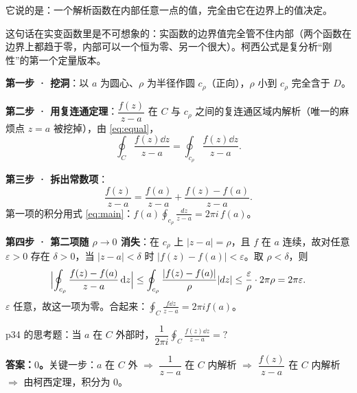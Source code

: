 \documentclass[11pt]{ctexart}
\let\origsubhdr\subhdr
\renewcommand{\subhdr}[1]{\par\needspace{4\baselineskip}\origsubhdr{#1}}
\begin{document}
它说的是：一个解析函数在内部任意一点的值，完全由它在边界上的值决定。


这句话在实变函数里是不可想象的：实函数的边界值完全管不住内部（两个函数在边界上都趋于零，内部可以一个恒为零、另一个很大）。柯西公式是复分析“刚性”的第一个定量版本。


\textbf{第一步 · 挖洞}：以 $a$ 为圆心、$\rho$ 为半径作圆 $c_\rho$（正向），$\rho$ 小到 $c_\rho$ 完全含于 $D$。

\textbf{第二步 · 用复连通定理}：$\dfrac{f(z)}{z-a}$ 在 $C$ 与 $c_\rho$ 之间的复连通区域内解析（唯一的麻烦点 $z=a$ 被挖掉），由 \eqref{eq:equal}，
\[ \oint_C\frac{f(z)\dd z}{z-a}=\oint_{c_\rho}\frac{f(z)\dd z}{z-a} . \]

\textbf{第三步 · 拆出常数项}：
\[ \frac{f(z)}{z-a}=\frac{f(a)}{z-a}+\frac{f(z)-f(a)}{z-a} . \]
第一项的积分用式 \eqref{eq:main}：$\displaystyle f(a)\oint_{c_\rho}\frac{dz}{z-a}=2\pi i\,f(a)$。

\textbf{第四步 · 第二项随 $\rho\to0$ 消失}：在 $c_\rho$ 上 $|z-a|=\rho$，且 $f$ 在 $a$ 连续，故对任意 $\varepsilon>0$ 存在 $\delta>0$，当 $|z-a|<\delta$ 时 $|f(z)-f(a)|<\varepsilon$。取 $\rho<\delta$，则
\[ \Bigl|\oint_{c_\rho}\frac{f(z)-f(a)}{z-a}\,\mathrm{d} z\Bigr|
\le\oint_{c_\rho}\frac{|f(z)-f(a)|}{\rho}|dz|
\le\frac{\varepsilon}{\rho}\cdot2\pi\rho=2\pi\varepsilon . \]
$\varepsilon$ 任意，故这一项为零。合起来：$\displaystyle\oint_C\frac{f\dd z}{z-a}=2\pi i f(a)$。




p34 的思考题：当 $a$ 在 $C$ 外部时，$\dfrac{1}{2\pi i}\displaystyle\oint_C\frac{f(z)\dd z}{z-a}=?$

\textbf{答案：$0$。}关键一步：$a$ 在 $C$ 外 $\Rightarrow$ $\dfrac{1}{z-a}$ 在 $C$ 内解析 $\Rightarrow$ $\dfrac{f(z)}{z-a}$ 在 $C$ 内解析 $\Rightarrow$ 由柯西定理，积分为 $0$。
\end{document}
